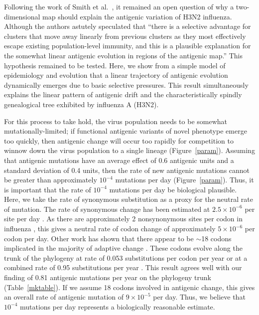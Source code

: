 \documentclass[11pt,oneside,letterpaper]{article}
\begin{document}
Following the work of Smith et al.\ \cite{Smith04}, it remained an open question of why a two-dimensional map should explain the antigenic variation of H3N2 influenza.  Although the authors astutely speculated that ``there is a selective advantage for clusters that move away linearly from previous clusters as they most effectively escape existing population-level immunity, and this is a plausible explanation for the somewhat linear antigenic evolution in regions of the antigenic map.''  This hypothesis remained to be tested.  Here, we show from a simple model of epidemiology and evolution that a linear trajectory of antigenic evolution dynamically emerges due to basic selective pressures.  This result simultaneously explains the linear pattern of antigenic drift \cite{Smith04} and the characteristically spindly genealogical tree \cite{Fitch97} exhibited by influenza A (H3N2).  

For this process to take hold, the virus population needs to be somewhat mutationally-limited; if functional antigenic variants of novel phenotype emerge too quickly, then antigenic change will occur too rapidly for competition to winnow down the virus population to a single lineage (Figure~\ref{param}).  Assuming that antigenic mutations have an average effect of 0.6 antigenic units and a standard deviation of 0.4 units, then the rate of new antigenic mutations cannot be greater than approximately $10^{-4}$ mutations per day (Figure~\ref{param}).  Thus, it is important that the rate of $10^{-4}$ mutations per day be biological plausible.  Here, we take the rate of synonymous substitution as a proxy for the neutral rate of mutation.  The rate of synonymous change has been estimated at $2.5 \times 10^{-6}$ per site per day \cite{OBrien09}.  As there are approximately 2 nonsynonymous sites per codon in influenza \cite{Yang00}, this gives a neutral rate of codon change of approximately $5 \times 10^{-6}$ per codon per day.  Other work has shown that there appear to be $\sim$18 codons implicated in the majority of adaptive change \cite{Bush99MBE}.  These codons evolve along the trunk of the phylogeny at rate of 0.053 substitutions per codon per year or at a combined rate of 0.95 substitutions per year \cite{Ferguson03}.  This result agrees well with our finding of 0.81 antigenic mutations per year on the phylogeny trunk (Table~\ref{mktable}).  If we assume 18 codons involved in antigenic change, this gives an overall rate of antigenic mutation of $9 \times 10^{-5}$ per day.  Thus, we believe that $10^{-4}$ mutations per day represents a biologically reasonable estimate.  
\end{document}
